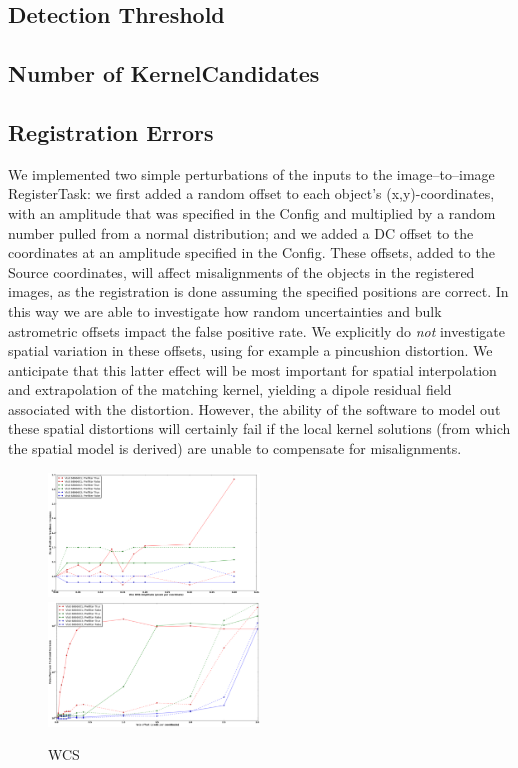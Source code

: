 \documentclass[prd, nofootinbib, floatfix, 11pt,tightenlines,times]{article}
\begin{document}
\subsection{Detection Threshold}

\subsection{Number of KernelCandidates}

\subsection{Registration Errors}

We implemented two simple perturbations of the inputs to the
image--to--image RegisterTask: we first added a random offset to each
object's (x,y)-coordinates, with an amplitude that was specified in
the Config and multiplied by a random number pulled from a normal
distribution; and we added a DC offset to the coordinates at an
amplitude specified in the Config.  These offsets, added to the Source
coordinates, will affect misalignments of the objects in the
registered images, as the registration is done assuming the specified
positions are correct.  In this way we are able to investigate how
random uncertainties and bulk astrometric offsets impact the false
positive rate.  We explicitly do {\it not} investigate spatial
variation in these offsets, using for example a pincushion distortion.
We anticipate that this latter effect will be most important for
spatial interpolation and extrapolation of the matching kernel,
yielding a dipole residual field associated with the distortion.
However, the ability of the software to model out these spatial
distortions will certainly fail if the local kernel solutions (from
which the spatial model is derived) are unable to compensate for
misalignments.

\begin{figure}
\includegraphics[width=0.5\textwidth]{figures/wcs_rms.eps} 
\includegraphics[width=0.5\textwidth]{figures/wcs_offset.eps} \\
\caption{WCS}
\label{wcs_offsets}
\end{figure}
\end{document}
